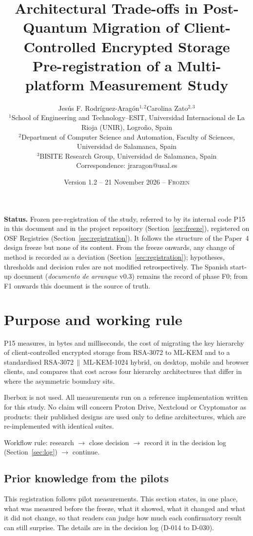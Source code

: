 \documentclass[11pt,a4paper]{article}
\title{Architectural Trade-offs in Post-Quantum Migration of Client-Controlled Encrypted Storage\\[0.3em]\large Pre-registration of a Multi-platform Measurement Study}
\author{Jesús F. Rodríguez-Aragón$^{1,2}$\qquad Carolina Zato$^{2,3}$\\[0.6em]
\footnotesize $^1$School of Engineering and Technology--ESIT, Universidad Internacional de La Rioja (UNIR), Logroño, Spain\\
\footnotesize $^2$Department of Computer Science and Automation, Faculty of Sciences, Universidad de Salamanca, Spain\\
\footnotesize $^3$BISITE Research Group, Universidad de Salamanca, Spain\\
\footnotesize Correspondence: jraragon@usal.es}
\date{Version 1.2 -- 21 November 2026 -- \textsc{Frozen}}
\begin{document}
\maketitle
\tableofcontents
\newpage

\textbf{Status.} Frozen pre-registration of the study, referred to by its internal code P15 in this document and in the project repository (Section~\ref{sec:freeze}), registered on OSF Registries (Section~\ref{sec:registration}). It follows the structure of the Paper~4 design freeze but none of its content. From the freeze onwards, any change of method is recorded as a deviation (Section~\ref{sec:registration}); hypotheses, thresholds and decision rules are not modified retrospectively. The Spanish start-up document (\emph{documento de arranque} v0.3) remains the record of phase F0; from F1 onwards this document is the source of truth.

\section{Purpose and working rule}
P15 measures, in bytes and milliseconds, the cost of migrating the key hierarchy of client-controlled encrypted storage from RSA-3072 to ML-KEM and to a standardised RSA-3072\,$\|$\,ML-KEM-1024 hybrid, on desktop, mobile and browser clients, and compares that cost across four hierarchy architectures that differ in where the asymmetric boundary sits.

Iberbox is not used. All measurements run on a reference implementation written for this study. No claim will concern Proton Drive, Nextcloud or Cryptomator as products: their published designs are used only to define architectures, which are re-implemented with identical suites.

Workflow rule: research $\rightarrow$ close decision $\rightarrow$ record it in the decision log (Section~\ref{sec:log}) $\rightarrow$ continue.

\subsection{Prior knowledge from the pilots}\label{sec:prior}
This registration follows pilot measurements. This section states, in one place, what was measured before the freeze, what it showed, what it changed and what it did not change, so that readers can judge how much each confirmatory result can still surprise. The details are in the decision log (D-014 to D-030).
\end{document}
